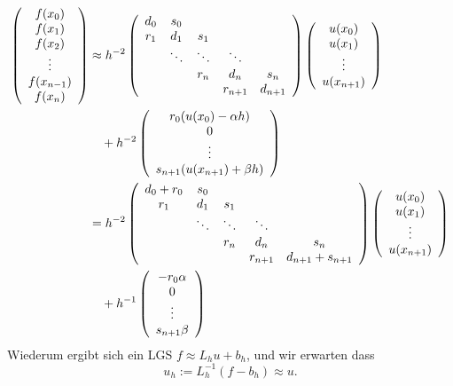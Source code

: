 \documentclass[12pt,a4paper]{book}
\theoremstyle{break}
\theoremstyle{nonumberplain}
\newcommand{\1}{\mathbbm{1}} 			      	%
\begin{document}
\begin{align*}
\left( \begin{array}{c} f(x_0)\\ f(x_1)\\ f(x_2)\\ \vdots \\ f(x_{n-1})\\ f(x_n) \end{array}\right)&\approx
h^{-2} \left( \begin{array}{c c c c c} d_0 & s_0 \\
r_1 & d_1 & s_1 &  & \\ & \ddots & \ddots & \ddots & \\  &  & r_{n} & d_{n} & s_{n}\\
  &  & & r_{n+1} & d_{n+1} 
\end{array}\right) 
\left( \begin{array}{c} u(x_0) \\ u(x_1)\\  \vdots  \\ u(x_{n+1})\end{array}\right) \\
& \quad 
 + h^{-2} \left( \begin{array}{c} r_0 (u(x_0)-\alpha h)  \\ 0 \\ \vdots \\ s_{n+1} (u(x_{n+1})+\beta h) \end{array}\right)\\
%
& = h^{-2} \left( \begin{array}{c c c c c} d_0+r_0 & s_0 \\
r_1 & d_1 & s_1 &  & \\ & \ddots & \ddots & \ddots & \\  &  & r_{n} & d_{n} & s_{n}\\
  &  & & r_{n+1} & d_{n+1}+s_{n+1} 
\end{array}\right) 
\left( \begin{array}{c} u(x_0) \\ u(x_1)\\  \vdots  \\ u(x_{n+1})\end{array}\right)\\
 & \quad + h^{-1} \left( \begin{array}{c} -  r_0 \alpha  \\ 0 \\ \vdots \\ s_{n+1} \beta  \end{array}\right)
\end{align*}
Wiederum ergibt sich ein LGS $f\approx L_h u+b_h$, und wir erwarten dass
\[
u_h:=L_h^{-1} (f-b_h)\approx u.
\] 
\end{document}
